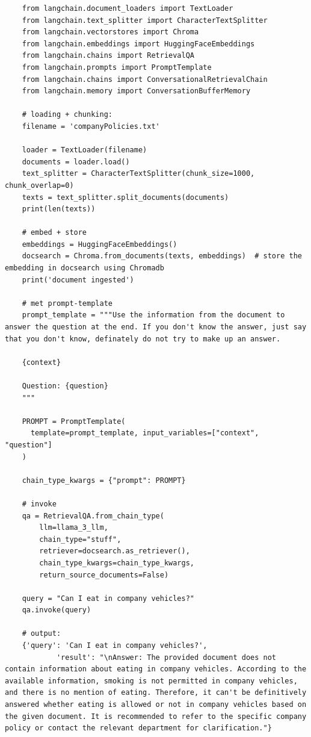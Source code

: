 \begin{listing}
    \begin{verbatim}
    from langchain.document_loaders import TextLoader
    from langchain.text_splitter import CharacterTextSplitter
    from langchain.vectorstores import Chroma
    from langchain.embeddings import HuggingFaceEmbeddings
    from langchain.chains import RetrievalQA
    from langchain.prompts import PromptTemplate
    from langchain.chains import ConversationalRetrievalChain
    from langchain.memory import ConversationBufferMemory
    
    # loading + chunking:
    filename = 'companyPolicies.txt'
    
    loader = TextLoader(filename)
    documents = loader.load()
    text_splitter = CharacterTextSplitter(chunk_size=1000, chunk_overlap=0)
    texts = text_splitter.split_documents(documents)
    print(len(texts))
    
    # embed + store
    embeddings = HuggingFaceEmbeddings()
    docsearch = Chroma.from_documents(texts, embeddings)  # store the embedding in docsearch using Chromadb
    print('document ingested')
    
    # met prompt-template
    prompt_template = """Use the information from the document to answer the question at the end. If you don't know the answer, just say that you don't know, definately do not try to make up an answer.
    
    {context}
    
    Question: {question}
    """
    
    PROMPT = PromptTemplate(
      template=prompt_template, input_variables=["context", "question"]
    )
    
    chain_type_kwargs = {"prompt": PROMPT}
    
    # invoke
    qa = RetrievalQA.from_chain_type(
        llm=llama_3_llm, 
        chain_type="stuff", 
        retriever=docsearch.as_retriever(), 
        chain_type_kwargs=chain_type_kwargs, 
        return_source_documents=False)
    
    query = "Can I eat in company vehicles?"
    qa.invoke(query)
    
    # output:
    {'query': 'Can I eat in company vehicles?',
            'result': "\nAnswer: The provided document does not contain information about eating in company vehicles. According to the available information, smoking is not permitted in company vehicles, and there is no mention of eating. Therefore, it can't be definitively answered whether eating is allowed or not in company vehicles based on the given document. It is recommended to refer to the specific company policy or contact the relevant department for clarification."}
    \end{verbatim}
    \caption[Dit is een voorbeeld van een Rag-pipeline in python code]{Een theoretisch voorbeeld van een RAG-pipeline in python van: \autocite{IBM2026}}
    \label{lst:ragpipelinevoorbeeld}
\end{listing}

